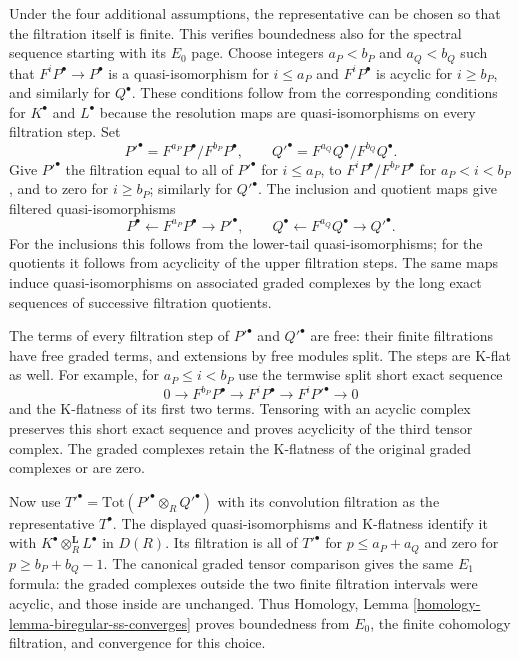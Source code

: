 \medskip\noindent
Under the four additional assumptions, the representative can be chosen
so that the filtration itself is finite. This verifies boundedness also
for the spectral sequence starting with its $E_0$ page. Choose integers
$a_P < b_P$ and $a_Q < b_Q$ such that $F^iP^\bullet \to P^\bullet$
is a quasi-isomorphism for $i \leq a_P$ and $F^iP^\bullet$ is acyclic
for $i \geq b_P$, and similarly for $Q^\bullet$. These conditions follow
from the corresponding conditions for $K^\bullet$ and $L^\bullet$
because the resolution maps are quasi-isomorphisms on every filtration step.
Set
$$
P'^\bullet = F^{a_P}P^\bullet/F^{b_P}P^\bullet,
\qquad
Q'^\bullet = F^{a_Q}Q^\bullet/F^{b_Q}Q^\bullet.
$$
Give $P'^\bullet$ the filtration equal to all of $P'^\bullet$ for
$i \leq a_P$, to $F^iP^\bullet/F^{b_P}P^\bullet$ for
$a_P < i < b_P$, and to zero for $i \geq b_P$; similarly for $Q'^\bullet$.
The inclusion and quotient maps give filtered quasi-isomorphisms
$$
P^\bullet \longleftarrow F^{a_P}P^\bullet \longrightarrow P'^\bullet,
\qquad
Q^\bullet \longleftarrow F^{a_Q}Q^\bullet \longrightarrow Q'^\bullet.
$$
For the inclusions this follows from the lower-tail quasi-isomorphisms;
for the quotients it follows from acyclicity of the upper filtration steps.
The same maps induce quasi-isomorphisms on associated graded complexes
by the long exact sequences of successive filtration quotients.

\medskip\noindent
The terms of every filtration step of $P'^\bullet$ and $Q'^\bullet$
are free: their finite filtrations have free graded terms, and extensions
by free modules split. The steps are K-flat as well. For example,
for $a_P \leq i < b_P$ use the termwise split short exact sequence
$$
0 \to F^{b_P}P^\bullet \to F^iP^\bullet \to F^iP'^\bullet \to 0
$$
and the K-flatness of its first two terms. Tensoring with an acyclic
complex preserves this short exact sequence and proves acyclicity of
the third tensor complex. The graded complexes retain the K-flatness
of the original graded complexes or are zero.

\medskip\noindent
Now use $T'^\bullet = \text{Tot}(P'^\bullet \otimes_R Q'^\bullet)$
with its convolution filtration as the representative $T^\bullet$.
The displayed quasi-isomorphisms and K-flatness identify it with
$K^\bullet \otimes_R^{\mathbf L} L^\bullet$ in $D(R)$.
Its filtration is all of $T'^\bullet$ for $p \leq a_P+a_Q$ and zero
for $p \geq b_P+b_Q-1$. The canonical graded tensor comparison gives
the same $E_1$ formula: the graded complexes outside the two finite
filtration intervals were acyclic, and those inside are unchanged.
Thus Homology, Lemma \ref{homology-lemma-biregular-ss-converges}
proves boundedness from $E_0$, the finite cohomology filtration,
and convergence for this choice.
